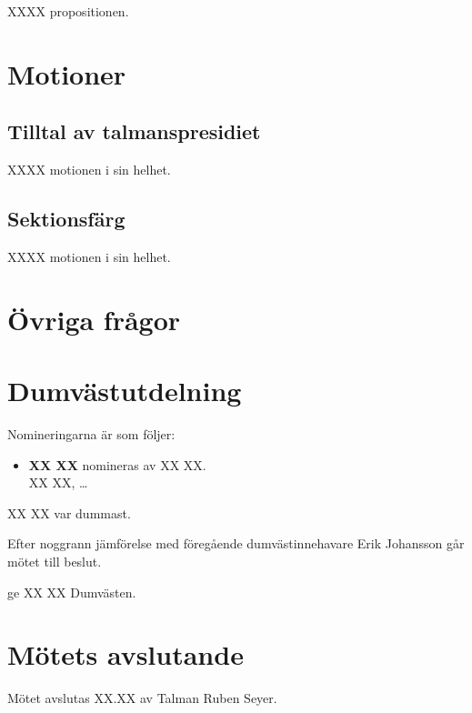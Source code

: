 \documentclass[hidelinks]{sektionsmote}
\begin{document}
\begin{beslut}
  \item XXXX propositionen.
\end{beslut}


\section{Motioner}
\subsection{Tilltal av talmanspresidiet}

\begin{beslut}
  \item XXXX motionen i sin helhet.
\end{beslut}


\subsection{Sektionsfärg}

\begin{beslut}
  \item XXXX motionen i sin helhet.
\end{beslut}


\section{Övriga frågor}


\section{Dumvästutdelning}
Nomineringarna är som följer:
\begin{itemize}
  \item \textbf{XX XX} nomineras av XX XX.\\
  XX XX, \dots

\end{itemize}

\begin{beslut}
  \item XX XX var dummast.
\end{beslut}
Efter noggrann jämförelse med föregående dumvästinnehavare Erik Johansson går mötet till beslut.
\begin{beslut}
  \item ge XX XX Dumvästen.
\end{beslut}

\section{Mötets avslutande}
Mötet avslutas XX.XX av Talman Ruben Seyer.
\end{document}
